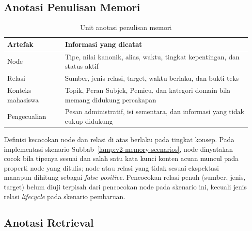 \subsection{Anotasi Penulisan Memori}

\begin{table}[!htbp]
\centering
\caption{Unit anotasi penulisan memori}
{\footnotesize
\begin{tabularx}{\textwidth}{|>{\raggedright\arraybackslash}p{2.8cm}|>{\raggedright\arraybackslash}X|}
\hline
\rowcolor{tableheadgray}
\textbf{Artefak} & \textbf{Informasi yang dicatat} \\
\hline
Node & Tipe, nilai kanonik, alias, waktu, tingkat kepentingan, dan status aktif \\
\hline
Relasi & Sumber, jenis relasi, target, waktu berlaku, dan bukti teks \\
\hline
Konteks mahasiswa & Topik, Peran Subjek, Pemicu, dan kategori domain bila memang didukung percakapan \\
\hline
Pengecualian & Pesan administratif, isi sementara, dan informasi yang tidak cukup didukung \\
\hline
\end{tabularx}
}
\end{table}

Definisi kecocokan node dan relasi di atas berlaku pada tingkat konsep. Pada implementasi skenario Subbab~\ref{lamp:v2-memory-scenarios}, node dinyatakan cocok bila tipenya sesuai dan salah satu kata kunci konten acuan muncul pada properti node yang ditulis; node atau relasi yang tidak sesuai ekspektasi manapun dihitung sebagai \textit{false positive}. Pencocokan relasi penuh (sumber, jenis, target) belum diuji terpisah dari pencocokan node pada skenario ini, kecuali jenis relasi \textit{lifecycle} pada skenario pembaruan.

\subsection{Anotasi Retrieval}


